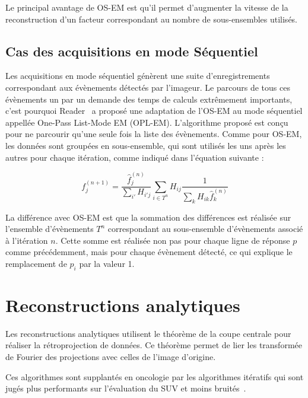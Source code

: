 Le principal avantage de OS-EM est qu'il permet d'augmenter la vitesse de la reconstruction d'un facteur correspondant au nombre de sous-ensembles utilisés.

	\subsection{Cas des acquisitions en mode Séquentiel}
\label{lab:OPLEM}

Les acquisitions en mode séquentiel génèrent une suite d'enregistrements correspondant aux évènements détectés par l'imageur. Le parcours de tous ces évènements un par un demande des temps de calculs extrêmement importants, c'est pourquoi Reader~\cite{reader2002one} a proposé une adaptation de l'OS-EM au mode séquentiel appellée One-Pass List-Mode EM (OPL-EM). L'algorithme proposé est conçu pour ne parcourir qu'une seule fois la liste des évènements. Comme pour OS-EM, les données sont groupées en sous-ensemble, qui sont utilisés les uns après les autres pour chaque itération, comme indiqué dans l'équation suivante :

\begin{equation}
	f_j^{(n+1)}=\frac{\hat{f}_j^{(n)}}{\sum\limits_{i'}H_{i'j}}\sum\limits_{i \in T^n}H_{ij}\frac{1}{\sum\limits_{k}H_{ik}\hat{f}_k^{(n)}}
\label{eq:OSEM_seq}
\end{equation}

La différence avec OS-EM est que la sommation des différences est réalisée sur l'ensemble d'évènements $T^n$ correspondant au sous-ensemble d'évènements associé à l'itération $n$. Cette somme est réalisée non pas pour chaque ligne de réponse $p$ comme précédemment, mais pour chaque évènement détecté, ce qui explique le remplacement de $p_i$ par la valeur 1.
		
	\section{Reconstructions analytiques}

Les reconstructions analytiques utilisent le théorème de la coupe centrale pour réaliser la rétroprojection de données. Ce théorème permet de lier les transformée de Fourier des projections avec celles de l'image d'origine. 
 
Ces algorithmes sont supplantés en oncologie par les algorithmes itératifs qui sont jugés plus performants sur l'évaluation du SUV et moins bruités~\cite{schoder2004clinical}.

